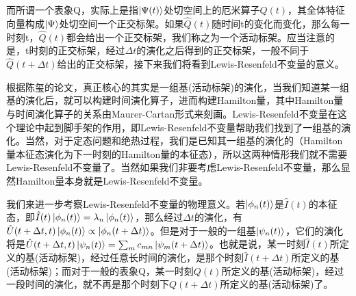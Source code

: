 \documentclass[a4paper]{article}
\begin{document}
        而所谓一个表象Q，实际上是指$\ket{\Psi(t)}$处切空间上的厄米算子$\hat{Q}(t)$，其全体特征向量构成$\ket{\Psi}$处切空间一个正交标架。如果$\hat{Q}(t)$随时间t的变化而变化，那么每一时刻t，$\hat{Q}(t)$都会给出一个正交标架，我们称之为一个活动标架。应当注意的是，t时刻的正交标架，经过$\Delta t$的演化之后得到的正交标架，一般不同于$\hat{Q}(t+\Delta t)$给出的正交标架，接下来我们将看到Lewis-Resenfeld不变量的意义。

        根据陈玺的论文，真正核心的其实是一组基(活动标架)的演化，当我们知道某一组基的演化后，就可以构建时间演化算子，进而构建Hamilton量，其中Hamilton量与时间演化算子的关系由Maurer-Cartan形式来刻画。Lewis-Resenfeld不变量在这个理论中起到脚手架的作用，即Lewis-Resenfeld不变量帮助我们找到了一组基的演化。当然，对于定态问题和绝热过程，我们是已知其一组基的演化的（Hamilton量本征态演化为下一时刻的Hamilton量的本征态），所以这两种情形我们就不需要Lewis-Resenfeld不变量了。当然如果我们非要考虑Lewis-Resenfeld不变量，那么显然Hamilton量本身就是Lewis-Resenfeld不变量。

        我们来进一步考察Lewis-Resenfeld不变量的物理意义。若$\ket{\phi_n(t)}$是$\hat{I}(t)$的本征态，即$\hat{I}(t)\ket{\phi_n(t)}=\lambda_n\ket{\phi_n(t)}$，那么经过$\Delta t$的演化，有$\hat{U}(t+\Delta t, t)\ket{\phi_n(t)}\propto\ket{\phi_n(t+\Delta t)}$。但是对于一般的一组基$\ket{\psi_n(t)}$，它们的演化将是$\hat{U}(t+\Delta t, t)\ket{\psi_n(t)}=\sum_m c_{mn}\ket{\psi_m(t+\Delta t)}$。也就是说，某一时刻$\hat{I}(t)$所定义的基(活动标架)，经过任意长时间的演化，是那个时刻$\hat{I}(t+\Delta t)$所定义的基(活动标架)；而对于一般的表象Q，某一时刻$Q(t)$所定义的基(活动标架)，经过一段时间的演化，就不再是那个时刻下$Q(t+\Delta t)$所定义的基(活动标架)了。
\end{document}
